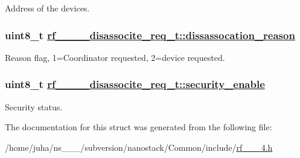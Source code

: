 Address of the devices. \hypertarget{structrf__802__15__4__disassocite__req__t_310f7da6cba70895a4b81fcb17d95e19}{
\subsubsection[dissassocation\_\-reason]{\setlength{\rightskip}{0pt plus 5cm}uint8\_\-t \hyperlink{structrf__802__15__4__disassocite__req__t_310f7da6cba70895a4b81fcb17d95e19}{rf\_\_\_\_\-disassocite\_\-req\_\-t::dissassocation\_\-reason}}}
\label{structrf__802__15__4__disassocite__req__t_310f7da6cba70895a4b81fcb17d95e19}


Reason flag, 1=Coordinator requested, 2=device requested. \hypertarget{structrf__802__15__4__disassocite__req__t_4f897e2cb21faf5dc3fdf4a6853cc57c}{
\subsubsection[security\_\-enable]{\setlength{\rightskip}{0pt plus 5cm}uint8\_\-t \hyperlink{structrf__802__15__4__disassocite__req__t_4f897e2cb21faf5dc3fdf4a6853cc57c}{rf\_\_\_\_\-disassocite\_\-req\_\-t::security\_\-enable}}}
\label{structrf__802__15__4__disassocite__req__t_4f897e2cb21faf5dc3fdf4a6853cc57c}


Security status. 

The documentation for this struct was generated from the following file:\begin{CompactItemize}
\item 
/home/juha/ns\_\_\_/subversion/nanostack/Common/include/\hyperlink{rf__802__15__4_8h}{rf\_\_\_\-4.h}\end{CompactItemize}

